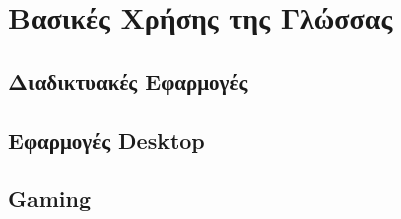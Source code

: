 \section{Βασικές Χρήσης της Γλώσσας}

\subsection{Διαδικτυακές Εφαρμογές}
\label{webapps}


\subsection{Εφαρμογές Desktop}
\label{desktopapps}


\subsection{Gaming}
\label{Gaming}
